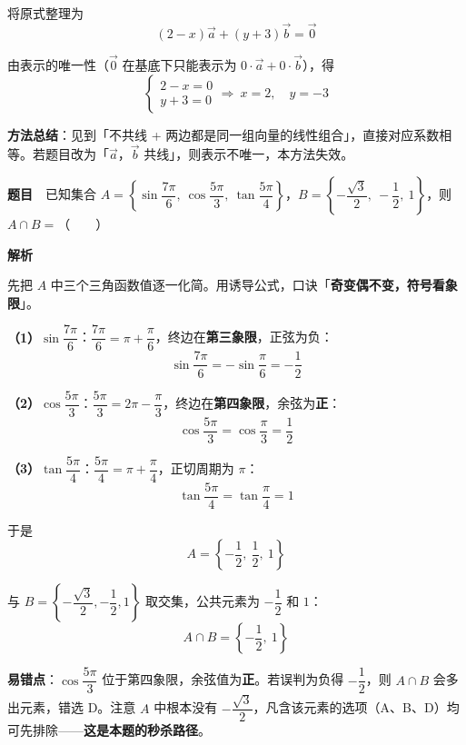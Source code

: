 将原式整理为
\[(2-x)\vec a+(y+3)\vec b=\vec 0\]

由表示的唯一性（$\vec 0$ 在基底下只能表示为 $0\cdot\vec a+0\cdot\vec b$），得
\[\begin{cases}2-x=0\\ y+3=0\end{cases}\Longrightarrow\ x=2,\quad y=-3\]


\begin{gktip}
\textbf{方法总结}：见到「不共线 + 两边都是同一组向量的线性组合」，直接对应系数相等。若题目改为「$\vec a$，$\vec b$ 共线」，则表示不唯一，本方法失效。
\end{gktip}

\par\medskip


\textbf{题目}　已知集合 $A=\left\{\sin\dfrac{7\pi}{6},\ \cos\dfrac{5\pi}{3},\ \tan\dfrac{5\pi}{4}\right\}$，$B=\left\{-\dfrac{\sqrt3}{2},\ -\dfrac12,\ 1\right\}$，则 $A\cap B=$（　　）

\textbf{解析}

先把 $A$ 中三个三角函数值逐一化简。用诱导公式，口诀「\textbf{奇变偶不变，符号看象限}」。

\textbf{（1）$\sin\dfrac{7\pi}{6}$}：$\dfrac{7\pi}{6}=\pi+\dfrac{\pi}{6}$，终边在\textbf{第三象限}，正弦为负：
\[\sin\dfrac{7\pi}{6}=-\sin\dfrac{\pi}{6}=-\frac12\]

\textbf{（2）$\cos\dfrac{5\pi}{3}$}：$\dfrac{5\pi}{3}=2\pi-\dfrac{\pi}{3}$，终边在\textbf{第四象限}，余弦为\textbf{正}：
\[\cos\dfrac{5\pi}{3}=\cos\dfrac{\pi}{3}=\frac12\]

\textbf{（3）$\tan\dfrac{5\pi}{4}$}：$\dfrac{5\pi}{4}=\pi+\dfrac{\pi}{4}$，正切周期为 $\pi$：
\[\tan\dfrac{5\pi}{4}=\tan\dfrac{\pi}{4}=1\]

于是
\[A=\left\{-\frac12,\ \frac12,\ 1\right\}\]

与 $B=\left\{-\dfrac{\sqrt3}{2},-\dfrac12,1\right\}$ 取交集，公共元素为 $-\dfrac12$ 和 $1$：
\[A\cap B=\left\{-\frac12,\ 1\right\}\]


\begin{gktip}
\textbf{易错点}：$\cos\dfrac{5\pi}{3}$ 位于第四象限，余弦值为\textbf{正}。若误判为负得 $-\dfrac12$，则 $A\cap B$ 会多出元素，错选 D。注意 $A$ 中根本没有 $-\dfrac{\sqrt3}{2}$，凡含该元素的选项（A、B、D）均可先排除——\textbf{这是本题的秒杀路径}。
\end{gktip}

